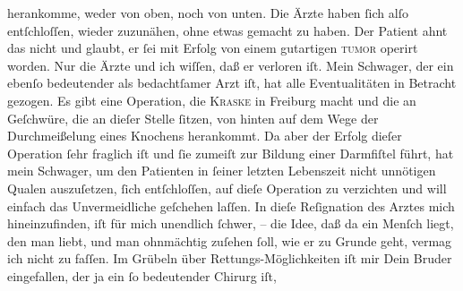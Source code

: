 \begin{ledgroupsized}[t]{13cm}
               herankomme, weder von oben, noch von unten. Die Ärzte haben ſich alſo entſchloſſen,
               wieder zuzunähen, ohne etwas gemacht zu haben. Der Patient ahnt das nicht und glaubt, er ſei
               mit Erfolg von einem gutartigen \textsc{tumor} operirt worden. Nur
               die Ärzte und ich wiſſen, daß er verloren iſt. {\pb}Mein
                  Schwager, der ein ebenſo
               bedeutender als bedachtſamer Arzt iſt, hat alle Eventualitäten in Betracht gezogen.
               Es gibt eine Operation, die \textsc{Kraske} in Freiburg macht und die an Geſchwüre, die
               an dieſer Stelle ſitzen, von hinten auf dem Wege der Durchmeißelung eines Knochens
               herankommt. Da aber der Erfolg dieſer Operation ſehr fraglich iſt und ſie zumeiſt zur
               Bildung einer Darmfiſtel führt, hat mein Schwager, um den Patienten in ſeiner letzten Lebenszeit nicht unnötigen Qualen
               auszuſetzen, ſich entſchloſſen, auf dieſe Operation zu verzichten und will einfach
               das Unvermeidliche geſchehen laſſen.\pend
           \pstart
           In dieſe Reſignation des Arztes {\pb}mich hineinzufinden, iſt für mich
               unendlich ſchwer, – die Idee, daß da ein Menſch liegt, den man liebt, und man  ohnmächtig zuſehen ſoll, wie er zu Grunde geht, vermag ich nicht zu faſſen. Im
               Grübeln über Rettungs-Möglichkeiten iſt mir Dein Bruder eingefallen, der ja ein ſo bedeutender Chirurg iſt,

\end{ledgroupsized}
